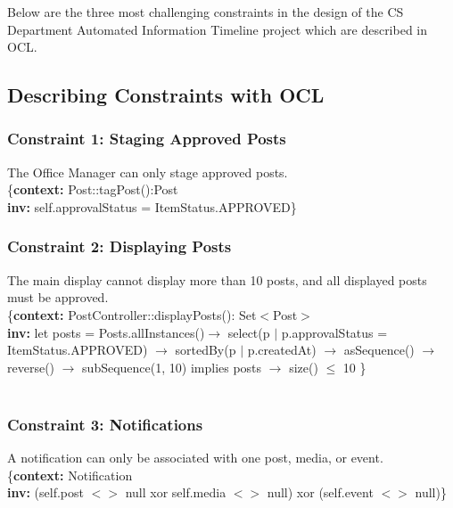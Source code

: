 Below are the three most challenging constraints in the design of the CS Department Automated Information Timeline project which are described in OCL.

\subsection{Describing Constraints with OCL}

\subsubsection{Constraint 1: Staging Approved Posts}

The Office Manager can only stage approved posts. \\

\{\textbf{context:} Post::tagPost():Post \\
\textbf{inv:} self.approvalStatus = ItemStatus.APPROVED\} \\

\subsubsection{Constraint 2: Displaying Posts}

The main display cannot display more than 10 posts, and all displayed posts must be approved. \\

\{\textbf{context:} PostController::displayPosts(): Set$<$Post$>$ \\
\textbf{inv:} let posts = Posts.allInstances()$\rightarrow$ select(p $|$ p.approvalStatus = ItemStatus.APPROVED) $\rightarrow$ sortedBy(p $|$ p.createdAt) $\rightarrow$ asSequence() $\rightarrow$ reverse() $\rightarrow$ subSequence(1, 10) implies posts $\rightarrow$ size() $\leq$ 10 \} \\
\\

\subsubsection{Constraint 3: Notifications}

A notification can only be associated with one post, media, or event. \\

\{\textbf{context:} Notification \\
\textbf{inv:} (self.post $<$$>$ null xor self.media $<$$>$ null) xor (self.event $<$$>$ null)\}  \\
 